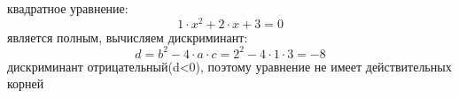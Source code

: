 \documentclass[12pt]{article}
\begin{document}
\begin{flushleft}
квадратное уравнение: 
$$ 1\cdot x^2+2\cdot x+3=0$$
является полным, вычисляем дискриминант:
$$ d=b^2-4\cdot a \cdot c = 2^2-4\cdot 1\cdot3 = -8$$
дискриминант отрицательный(d<0),
поэтому уравнение не имеет действительных корней
\end{flushleft}
\end{document}
